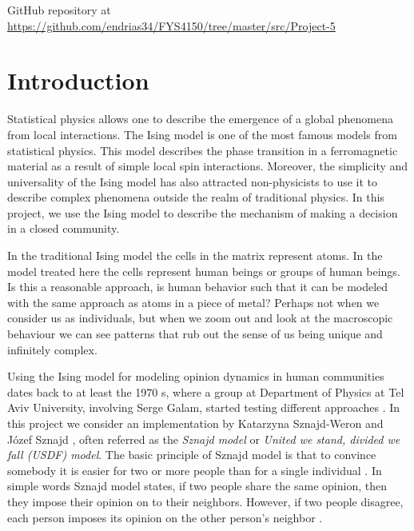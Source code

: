 \documentclass[a4paper]{article}
\begin{document}
\newpage
\tableofcontents

\begin{center}
    GitHub repository at \url{https://github.com/endrias34/FYS4150/tree/master/src/Project-5}
\end{center}
\newcommand{\half}{\frac{1}{2}}
\newcommand{\dx}{{\Delta x}}
\newcommand{\bigO}{{\mathcal{O}}}
\newpage
\vspace*{2cm}
\section{Introduction}

Statistical physics allows one to describe the emergence of a global phenomena from local interactions. The Ising model is one of the most famous models from statistical physics. This model describes the phase transition in a ferromagnetic material as a result of simple local spin interactions. Moreover, the simplicity and universality of the Ising model has also attracted non-physicists to use it to describe complex phenomena outside the realm of traditional physics. In this project, we use the Ising model to describe the mechanism of making a decision in a closed community.

In the traditional Ising model the cells in the matrix represent atoms. In the model treated here the cells represent human beings or groups of human beings. Is this a reasonable approach, is human behavior such that it can be modeled with the same approach as atoms in a piece of metal? Perhaps not when we consider us as individuals, but when we zoom out and look at the macroscopic behaviour we can see patterns that rub out the sense of us being unique and infinitely complex.

Using the Ising model for modeling opinion dynamics in human communities dates back to at least the 1970 s, where a group at Department of Physics at Tel Aviv University, involving Serge Galam, started testing different approaches \cite{galam}. In this project we consider an implementation by Katarzyna Sznajd-Weron and Józef Sznajd \cite{opinion}, often referred as the \textit{Sznajd model} or \textit{United we stand, divided we fall (USDF) model}. The basic principle of Sznajd model is that to convince somebody it is easier for two or more people than for a single individual \cite{Castellano_2009}. In simple words Sznajd model states, if two people share the same opinion, then they impose their opinion on to their neighbors. However, if two people disagree, each person imposes its opinion on the other person’s neighbor \cite{Castellano_2009}.
\end{document}
